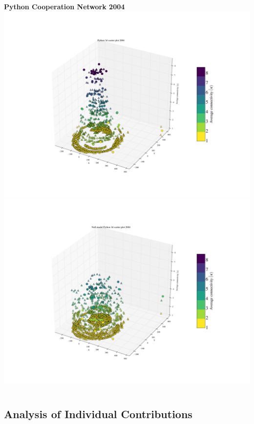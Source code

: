 \documentclass[ignorenonframetext,red,8pt]{beamer}
\begin{document}
\begin{frame}
\begin{columns}[c]
\begin{column}{0.5\textwidth}
\begin{center}
\textbf{Python Cooperation Network 2004}
\includegraphics[scale=0.12]{../../figures/3d_scatter_python_2004}
\newline
\includegraphics[scale=0.12]{../../figures/3d_scatter_python_2004_null}
\end{center}
\end{column}
\end{columns}

\end{frame}

\subsection{Analysis of Individual Contributions}
\end{document}
